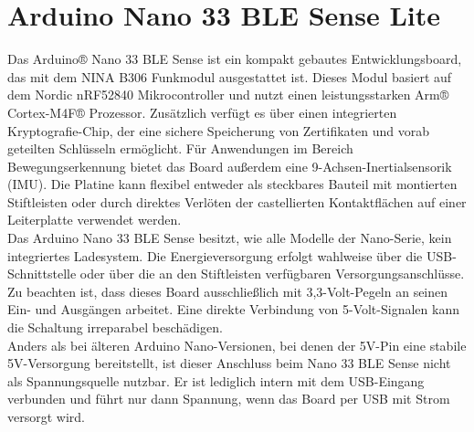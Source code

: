 \section{Arduino Nano 33 BLE Sense Lite}
\label{chap:ArduinoNano33BLESenseLite}
Das Arduino® Nano 33 BLE Sense ist ein kompakt gebautes Entwicklungsboard, das mit dem NINA B306 Funkmodul ausgestattet ist. Dieses Modul basiert auf dem Nordic nRF52840 Mikrocontroller und nutzt einen leistungsstarken Arm® Cortex-M4F® Prozessor. Zusätzlich verfügt es über einen integrierten Kryptografie-Chip, der eine sichere Speicherung von Zertifikaten und vorab geteilten Schlüsseln ermöglicht. Für Anwendungen im Bereich Bewegungserkennung bietet das Board außerdem eine 9-Achsen-Inertialsensorik (IMU). Die Platine kann flexibel entweder als steckbares Bauteil mit montierten Stiftleisten oder durch direktes Verlöten der castellierten Kontaktflächen auf einer Leiterplatte verwendet werden.\cite{Arduino:2025}\\
Das Arduino Nano 33 BLE Sense besitzt, wie alle Modelle der Nano-Serie, kein integriertes Ladesystem. Die Energieversorgung erfolgt wahlweise über die USB-Schnittstelle oder über die an den Stiftleisten verfügbaren Versorgungsanschlüsse.\cite{Arduino:2025}\\
Zu beachten ist, dass dieses Board ausschließlich mit 3,3-Volt-Pegeln an seinen Ein- und Ausgängen arbeitet. Eine direkte Verbindung von 5-Volt-Signalen kann die Schaltung irreparabel beschädigen.\cite{Arduino:2025} \\
Anders als bei älteren Arduino Nano-Versionen, bei denen der 5V-Pin eine stabile 5V-Versorgung bereitstellt, ist dieser Anschluss beim Nano 33 BLE Sense nicht als Spannungsquelle nutzbar. Er ist lediglich intern mit dem USB-Eingang verbunden und führt nur dann Spannung, wenn das Board per USB mit Strom versorgt wird.\cite{Arduino:2025}

